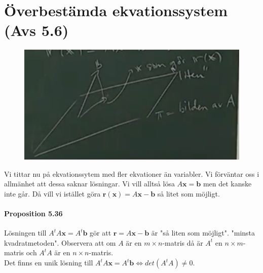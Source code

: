 \section{Överbestämda ekvationssystem (Avs 5.6)}
\begin{figure}
    \vspace{-13pt}
    \centering
    \includegraphics[scale=0.44]{imgs/img01.png}
    \vspace{-20pt}
\end{figure}
Vi tittar nu på ekvationssytem med fler ekvationer än variabler.
Vi förväntar oss i allmänhet att dessa saknar lösningar.
Vi vill alltså lösa $A\bm{x}=\bm{b}$ men det kanske inte går.
Då vill vi istället göra $\bm{r}(\bm{x})=A\bm{x}-\bm{b}$ så litet som möjligt.

\paragraph{Proposition 5.36} Lösningen till $A^{t}A\bm{x}=A^{t}\bm{b}$ gör att $\bm{r}=A\bm{x}-\bm{b}$ är "så liten som möjligt".
"minsta kvadratmetoden".
Observera att om $A$ är en $m\times n$-matris då är $A^{t}$ en $n\times m$-matris och $A^{t}A$ är en $n\times n$-matris.\\
Det finns en unik lösning till $A^{t}A\bm{x}=A^{t}\bm{b}\Leftrightarrow det(A^{t}A)\neq 0$.

\clearpage

